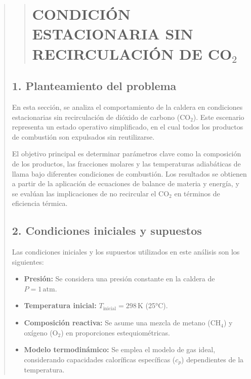 \documentclass[11pt, a4paper]{article}
\begin{document}
\begin{quote}
\begin{center}
\begin{adjustwidth}{-1.7cm}{-1cm}
\newpage
\begin{quote}
\setlength{\parskip}{1pt} %
\vspace*{0.3cm} %
\hypertarget{estacionario}{%
\section{CONDICIÓN ESTACIONARIA SIN RECIRCULACIÓN DE CO$_2$}\label{estacionario}}
\end{quote}
\vspace*{1cm} %

\subsection*{1. Planteamiento del problema}

En esta sección, se analiza el comportamiento de la caldera en condiciones estacionarias sin recirculación de dióxido de carbono (\(\text{CO}_2\)). Este escenario representa un estado operativo simplificado, en el cual todos los productos de combustión son expulsados sin reutilizarse.

El objetivo principal es determinar parámetros clave como la composición de los productos, las fracciones molares y las temperaturas adiabáticas de llama bajo diferentes condiciones de combustión. Los resultados se obtienen a partir de la aplicación de ecuaciones de balance de materia y energía, y se evalúan las implicaciones de no recircular el \(\text{CO}_2\) en términos de eficiencia térmica.

\subsection*{2. Condiciones iniciales y supuestos}

Las condiciones iniciales y los supuestos utilizados en este análisis son los siguientes:
\begin{itemize}
    \item \textbf{Presión:} Se considera una presión constante en la caldera de \(P = 1 \, \text{atm}\).
    \item \textbf{Temperatura inicial:} \(T_{\text{inicial}} = 298 \, \text{K}\) (25°C).
    \item \textbf{Composición reactiva:} Se asume una mezcla de metano (\(\text{CH}_4\)) y oxígeno (\(\text{O}_2\)) en proporciones estequiométricas.
    \item \textbf{Modelo termodinámico:} Se emplea el modelo de gas ideal, considerando capacidades caloríficas específicas (\(c_p\)) dependientes de la temperatura.
\end{itemize}


\end{adjustwidth}
\end{center}
\end{quote}
\end{document}
